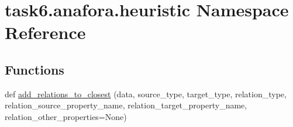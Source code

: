 \hypertarget{namespacetask6_1_1anafora_1_1heuristic}{}\section{task6.\+anafora.\+heuristic Namespace Reference}
\label{namespacetask6_1_1anafora_1_1heuristic}
\subsection*{Functions}
\begin{DoxyCompactItemize}
\item 
def \hyperlink{namespacetask6_1_1anafora_1_1heuristic_aeec05eea339675bfa584e8486470ba83}{add\+\_\+relations\+\_\+to\+\_\+closest} (data, source\+\_\+type, target\+\_\+type, relation\+\_\+type, relation\+\_\+source\+\_\+property\+\_\+name, relation\+\_\+target\+\_\+property\+\_\+name, relation\+\_\+other\+\_\+properties=None)
\end{DoxyCompactItemize}
